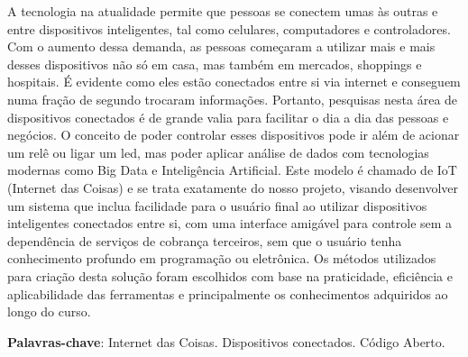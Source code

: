 \documentclass[../../layout.tex]{subfiles}
\begin{document}
\begin{resumo}
\hspace*{3em}
A tecnologia na atualidade permite que pessoas se conectem umas às outras e entre dispositivos inteligentes, tal como celulares, computadores e controladores. Com o aumento dessa demanda, as pessoas começaram a utilizar mais e mais desses dispositivos não só em casa, mas também em mercados, shoppings e hospitais. É evidente como eles estão conectados entre si via internet e conseguem numa fração de segundo trocaram informações. Portanto, pesquisas nesta área de dispositivos conectados é de grande valia para facilitar o dia a dia das pessoas e negócios. O conceito de poder controlar esses dispositivos pode ir além de acionar um relê ou ligar um led, mas poder aplicar análise de dados com tecnologias modernas como Big Data e Inteligência Artificial. Este modelo é chamado de IoT (Internet das Coisas) e se trata exatamente do nosso projeto, visando desenvolver um sistema que inclua facilidade para o usuário final ao utilizar dispositivos inteligentes conectados entre si, com uma interface amigável para controle sem a dependência de serviços de cobrança terceiros, sem que o usuário tenha conhecimento profundo em programação ou eletrônica. Os métodos utilizados para criação desta solução foram escolhidos com base na praticidade, eficiência e aplicabilidade das ferramentas e principalmente os conhecimentos adquiridos ao longo do curso.
\vspace{\onelineskip}

\noindent
\textbf{Palavras-chave}: Internet das Coisas. Dispositivos conectados. Código Aberto.
\end{resumo}
\end{document}
